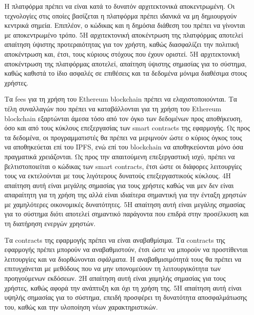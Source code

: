 \begin{enumerate}[label=\textbf{<ΜΛΑ-\arabic*>}, leftmargin=\parindent, align=left, labelwidth=\parindent, labelsep=0pt]
	\sysReqItem
		{\label{srs:non-functional-srs-maximum-decentraliztion}}
		{Η πλατφόρμα πρέπει να είναι κατά το δυνατόν αρχιτεκτονικά αποκεντρωμένη.}
		{Οι τεχνολογίες στις οποίες βασίζεται η πλατφόρμα πρέπει ιδανικά να μη δημιουργούν κεντρικά σημεία. Επιπλέον, ο κώδικας και η δημόσια διάθεση του πρέπει να γίνονται με αποκεντρωμένο τρόπο.}
		{5}{Η αρχιτεκτονική αποκέντρωση της πλατφόρμας αποτελεί απαίτηση ύψιστης προτεραιότητας για τον χρήστη, καθώς διασφαλίζει την πολιτική αποκέντρωση και, έτσι, τους κύριους στόχους που έχουν οριστεί.}
		{5}{Η αρχιτεκτονική αποκέντρωση της πλατφόρμας αποτελεί, απαίτηση ύψιστης σημασίας για το σύστημα, καθώς καθιστά το ίδιο ασφαλές σε επιθέσεις και τα δεδομένα μόνιμα διαθέσιμα στους χρήστες.}

	\sysReqItem
		{\label{srs:non-functional-srs-minimize-fees}}
		{Τα fees για τη χρήση του Ethereum blockchain πρέπει να ελαχιστοποιούνται.}
		{Τα τέλη συναλλαγών που πρέπει να καταβάλλονται για τη χρήση του Ethereum blockchain εξαρτώνται άμεσα τόσο από τον όγκο των δεδομένων προς αποθήκευση, όσο και από τους κύκλους επεξεργασίας των smart contracts της εφαρμογής. Ως προς τα δεδομένα, οι προγραμματιστές θα πρέπει να μεριμνούν ώστε ο κύριος όγκος τους να αποθηκεύεται επί του IPFS, ενώ επί του blockchain να αποθηκεύονται μόνο όσα πραγματικά χρειάζονται. Ως προς την απαιτούμενη επεξεργαστική ισχύ, πρέπει να βελτιστοποιείται ο κώδικας των smart contracts, έτσι ώστε οι διάφορες λειτουργίες τους να εκτελούνται με τους λιγότερους δυνατούς επεξεργαστικούς κύκλους.}
		{4}{Η απαίτηση αυτή είναι μεγάλης σημασίας για τους χρήστες καθώς ναι μεν δεν είναι απαραίτητη για τη χρήση της αλλά είναι ιδιαίτερα σημαντική για την ένταξη χρηστών με χαμηλότερες οικονομικές δυνατότητες.}
		{5}{Η απαίτηση αυτή είναι μεγάλης σημασίας για το σύστημα διότι αποτελεί σημαντικό παράγοντα που επιδρά στην προσέλκυση και τη διατήρηση ενεργών χρηστών.}

	\sysReqItem
		{\label{srs:non-functional-srs-upgrade-contracts}}
		{Τα contracts της εφαρμογής πρέπει να είναι αναβαθμίσιμα.}
		{Τα contracts της εφαρμογής πρέπει μπορούν να αναβαθμιστούν, έτσι ώστε να μπορούν να προστίθενται λειτουργίες και να διορθώνονται σφάλματα. Η αναβαθμισιμότητά τους θα πρέπει να επιτυγχάνεται με μεθόδους που να μην υπονομεύουν τη λειτουργικότητα των  προηγούμενων εκδόσεων.}
		{2}{Η απαίτηση αυτή είναι χαμηλής σημασίας για τους χρήστες, καθώς αφορά την ανάπτυξη και όχι τη χρήση της.}
		{5}{Η απαίτηση αυτή είναι υψηλής σημασίας για το σύστημα, επειδή προσφέρει τη δυνατότητα αποσφαλμάτωσης του, καθώς και την υλοποίηση νέων χαρακτηριστικών.}
\end{enumerate}
